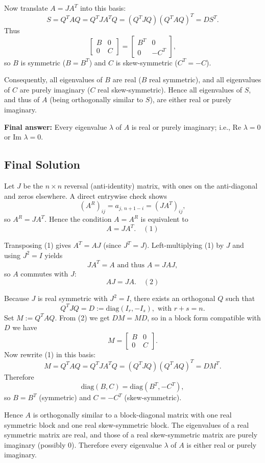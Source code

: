 \documentclass[12pt,a4paper]{article}
\theoremstyle{definition}
\begin{document}
    Now translate $A = J A^T$ into this basis:
    $$S = Q^T A Q = Q^T J A^T Q = (Q^T J Q)(Q^T A Q)^T = D S^T.$$
    Thus
    $$\begin{bmatrix} B & 0 \\ 0 & C \end{bmatrix} = \begin{bmatrix} B^T & 0 \\ 0 & -C^T \end{bmatrix},$$
    so $B$ is symmetric ($B = B^T$) and $C$ is skew-symmetric ($C^T = -C$).

    Consequently, all eigenvalues of $B$ are real ($B$ real symmetric), and all eigenvalues of $C$ are purely imaginary ($C$ real skew-symmetric). Hence all eigenvalues of $S$, and thus of $A$ (being orthogonally similar to $S$), are either real or purely imaginary.

    \textbf{Final answer:} Every eigenvalue $\lambda$ of $A$ is real or purely imaginary; i.e., $\text{Re } \lambda = 0$ or $\text{Im } \lambda = 0$.
    \subsection{Final Solution}
    Let $J$ be the $n \times n$ reversal (anti-identity) matrix, with ones on the anti-diagonal and zeros elsewhere. A direct entrywise check shows
    $$(A^R)_{ij} = a_{j,\,n+1-i} = (J A^T)_{ij},$$
    so $A^R = J A^T$. Hence the condition $A = A^R$ is equivalent to
    $$A = J A^T. \quad {(1)}$$

    Transposing (1) gives $A^T = A J$ (since $J^T = J$). Left-multiplying (1) by $J$ and using $J^2 = I$ yields
    $$J A^T = A \text{ and thus } A = J A J,$$
    so $A$ commutes with $J$:
    $$A J = J A. \quad {(2)}$$

    Because $J$ is real symmetric with $J^2 = I$, there exists an orthogonal $Q$ such that
    $$Q^T J Q = D := \text{diag}(I_r, -I_s), \text{ with } r + s = n.$$
    Set $M := Q^T A Q$. From (2) we get $D M = M D$, so in a block form compatible with $D$ we have
    $$M = \begin{bmatrix} B & 0 \\ 0 & C \end{bmatrix}.$$
    Now rewrite (1) in this basis:
    $$M = Q^T A Q = Q^T J A^T Q = (Q^T J Q)(Q^T A Q)^T = D M^T.$$
    Therefore
    $$\text{diag}(B, C) = \text{diag}(B^T, -C^T),$$
    so $B = B^T$ (symmetric) and $C = -C^T$ (skew-symmetric).

    Hence $A$ is orthogonally similar to a block-diagonal matrix with one real symmetric block and one real skew-symmetric block. The eigenvalues of a real symmetric matrix are real, and those of a real skew-symmetric matrix are purely imaginary (possibly 0). Therefore every eigenvalue $\lambda$ of $A$ is either real or purely imaginary.
\end{document}

